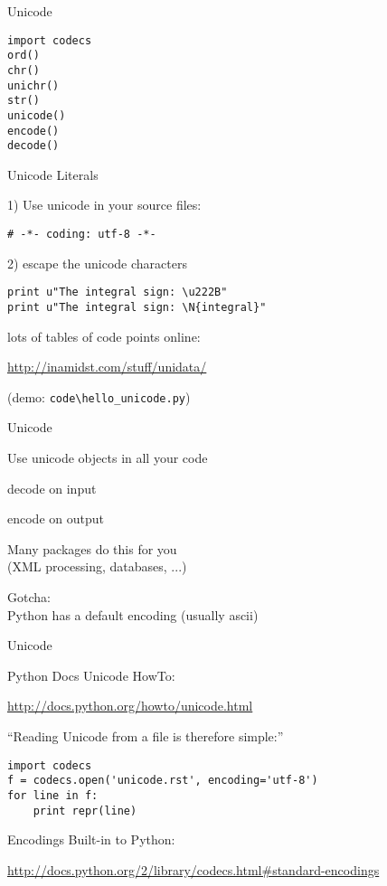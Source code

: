 \documentclass{beamer}
\begin{document}
\begin{frame}[fragile]{Unicode}

{\large
\begin{verbatim}
import codecs
ord()
chr()
unichr()
str()
unicode()
encode()
decode()
\end{verbatim}
}
\end{frame}

\begin{frame}[fragile]{Unicode Literals}


{\Large 1) Use unicode in your source files:}

\begin{verbatim}
# -*- coding: utf-8 -*-
\end{verbatim}

\vfill
{\Large 2) escape the unicode characters}

\begin{verbatim}
print u"The integral sign: \u222B"
print u"The integral sign: \N{integral}"
\end{verbatim}

{\large lots of tables of code points online:}

\url{http://inamidst.com/stuff/unidata/}

\vfill
(demo: \verb|code\hello_unicode.py|)
\end{frame}


\begin{frame}[fragile]{Unicode}

{\Large
Use unicode objects in all your code

\vfill
decode on input

\vfill
encode on output

\vfill
Many packages do this for you\\
\hspace{0.25in} (XML processing, databases, ...)

\vfill
Gotcha:\\
\hspace{0.25in} Python has a default encoding (usually ascii)
}
\end{frame}

\begin{frame}[fragile]{Unicode}

{\Large Python Docs Unicode HowTo:}

\url{http://docs.python.org/howto/unicode.html}

\vfill
{\Large ``Reading Unicode from a file is therefore simple:''}

\begin{verbatim}
import codecs
f = codecs.open('unicode.rst', encoding='utf-8')
for line in f:
    print repr(line)
\end{verbatim}

\vfill
{\Large Encodings Built-in to Python:}

\url{http://docs.python.org/2/library/codecs.html#standard-encodings}

\end{frame}
\end{document}

